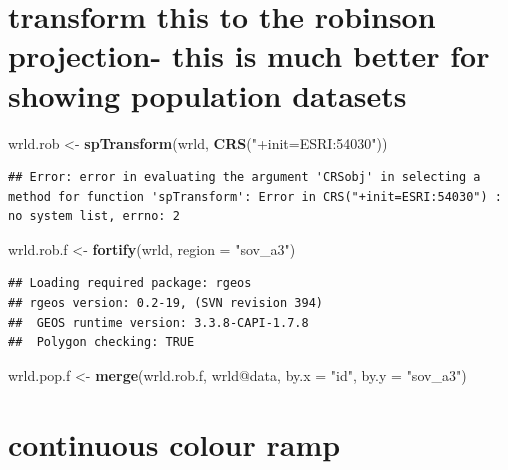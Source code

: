 \documentclass[]{article}
\newenvironment{Shaded}{}{}
\newcommand{\KeywordTok}[1]{\textcolor[rgb]{0.00,0.44,0.13}{\textbf{{#1}}}}
\newcommand{\DataTypeTok}[1]{\textcolor[rgb]{0.56,0.13,0.00}{{#1}}}
\newcommand{\StringTok}[1]{\textcolor[rgb]{0.25,0.44,0.63}{{#1}}}
\newcommand{\NormalTok}[1]{{#1}}
\begin{document}
\section{transform this to the robinson projection- this is much better
for showing population datasets}

\begin{Shaded}
\begin{Highlighting}[]
\NormalTok{wrld.rob <-}\StringTok{ }\KeywordTok{spTransform}\NormalTok{(wrld, }\KeywordTok{CRS}\NormalTok{(}\StringTok{"+init=ESRI:54030"}\NormalTok{))}
\end{Highlighting}
\end{Shaded}

\begin{verbatim}
## Error: error in evaluating the argument 'CRSobj' in selecting a method for function 'spTransform': Error in CRS("+init=ESRI:54030") : no system list, errno: 2
\end{verbatim}

\begin{Shaded}
\begin{Highlighting}[]

\NormalTok{wrld.rob.f <-}\StringTok{ }\KeywordTok{fortify}\NormalTok{(wrld, }\DataTypeTok{region =} \StringTok{"sov_a3"}\NormalTok{)}
\end{Highlighting}
\end{Shaded}

\begin{verbatim}
## Loading required package: rgeos
## rgeos version: 0.2-19, (SVN revision 394)
##  GEOS runtime version: 3.3.8-CAPI-1.7.8 
##  Polygon checking: TRUE
\end{verbatim}

\begin{Shaded}
\begin{Highlighting}[]

\NormalTok{wrld.pop.f <-}\StringTok{ }\KeywordTok{merge}\NormalTok{(wrld.rob.f, wrld@data, }\DataTypeTok{by.x =} \StringTok{"id"}\NormalTok{, }\DataTypeTok{by.y =} \StringTok{"sov_a3"}\NormalTok{)}
\end{Highlighting}
\end{Shaded}

\section{continuous colour ramp}
\end{document}
